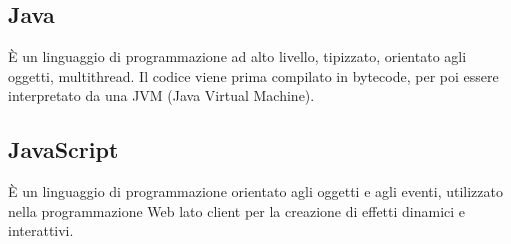 \section{}
\subsection*{Java} È un linguaggio di programmazione ad alto livello, tipizzato, orientato agli oggetti, multithread. Il codice viene prima compilato in bytecode, per poi essere interpretato da una JVM (Java Virtual Machine).

\subsection*{JavaScript} È un linguaggio di programmazione orientato agli oggetti e agli eventi, utilizzato nella programmazione Web lato client per la creazione di effetti dinamici e interattivi.